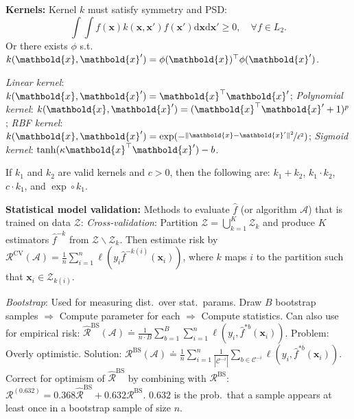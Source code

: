 \documentclass[9pt]{extarticle}
\newenvironment{topic}[1]
{\textbf{\sffamily \colorbox{black}{\rlap{\textbf{\textcolor{white}{#1}}}\hspace{\linewidth}\hspace{-2\fboxsep}}}}
{}
\newenvironment{subtopic}[1]
{\textbf{\sffamily #1:}}
{}
\renewcommand{\vec}[1]{\ensuremath{\mathbold{#1}}}
\begin{document}
\begin{multicols*}{3}
\begin{topic}{Gaussian processes}
        \begin{subtopic}{Kernels}
            Kernel $k$ must satisfy symmetry and PSD: \[
                \int \int f(\vec{x}) k(\vec{x}, \vec{x}') f(\vec{x}') \mathrm{d}\vec{x}\mathrm{d}\vec{x}' \geq 0, \quad \forall f \in L_2.
            \]
            Or there exists $\phi$ s.t.\ $k(\vec{x}, \vec{x}') = \transpose{\phi(\vec{x})} \phi(\vec{x}')$.

            \textit{Linear kernel}: $k(\vec{x}, \vec{x}') = \transpose{\vec{x}} \vec{x}'$;
            \textit{Polynomial kernel}: $k(\vec{x}, \vec{x}') = ( \transpose{\vec{x}} \vec{x}' + 1 )^p$;
            \textit{RBF kernel}: $k(\vec{x},\vec{x}') = \exp ( -\nicefrac{\| \vec{x} - \vec{x}' \|^2}{\ell^2})$;
            \textit{Sigmoid kernel}: $\tanh(\kappa \transpose{\vec{x}} \vec{x}') - b$.

            If $k_1$ and $k_2$ are valid kernels and $c > 0$, then the following are: $k_1 + k_2$, $k_1 \cdot
                k_2$, $c \cdot k_1$, and $\exp \circ k_1$.

        \end{subtopic}

    \end{topic}

    \begin{topic}{Uncertainty quantification}
        \begin{subtopic}{Statistical model validation}
            Methods to evaluate $\hat{f}$ (or algorithm $\mathcal{A}$) that is trained on data $\mathcal{Z}$:
            \textit{Cross-validation}: Partition $\mathcal{Z} = \bigcup_{k=1}^K \mathcal{Z}_k$ and produce $K$
            estimators $\hat{f}^{-k}$ from $\mathcal{Z} \backslash \mathcal{Z}_k$. Then estimate risk by
            $\mathcal{R}^{\mathrm{CV}}(\mathcal{A}) = \frac{1}{n} \sum_{i=1}^{n} \ell(y_i
                \hat{f}^{-k(i)}(\vec{x}_i))$, where $k$ maps $i$ to the partition such that $\vec{x}_i \in
                \mathcal{Z}_{k(i)}$.

            \textit{Bootstrap}: Used for measuring dist.\ over stat.\ params. Draw $B$
            bootstrap samples $\Rightarrow$ Compute parameter for each $\Rightarrow$ Compute statistics. Can
            also use for empirical risk: $\hat{\mathcal{R}}^{\mathrm{BS}}(\mathcal{A}) \doteq \frac{1}{n\cdot
                    B} \sum_{b=1}^{B} \sum_{i=1}^{n} \ell(y_i, \hat{f}^{*b}(\vec{x}_i))$. Problem: Overly optimistic.
            Solution: $\mathcal{R}^{\mathrm{BS}}(\mathcal{A}) \doteq \frac{1}{n} \sum_{i=1}^{n}
                \frac{1}{|\mathcal{C}^{-i}|} \sum_{b \in \mathcal{C}^{-i}} \ell(y_i, \hat{f}^{*b}(\vec{x}_i))$.
            Correct for optimism of $\hat{\mathcal{R}}^{\mathrm{BS}}$ by combining with
            $\mathcal{R}^{\mathrm{BS}}$: $\mathcal{R}^{(0.632)} = 0.368 \hat{\mathcal{R}}^{\mathrm{BS}} + 0.632
                \mathcal{R}^{\mathrm{BS}}$. $0.632$ is the prob.\ that a sample appears at least once in a
            bootstrap sample of size $n$.
        \end{subtopic}


\end{topic}
\end{multicols*}
\end{document}
